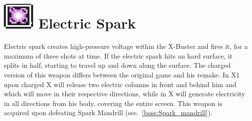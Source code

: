 \section{\includegraphics[scale=0.2]{figures/X1/weapons/E_Spark.jpg} Electric Spark}\label{Electric_spark}
Electric spark creates high-pressure voltage within the X-Buster and fires it, for a maximum of three shots at time. If the electric spark hits an hard surface, it splits in half, starting to travel up and down along the surface. The charged version of this weapon differs between the original game and his remake. In X1 upon charged X will release two electric columns in front and behind him and which will move in their respective directions, while in \mhx X will generate electricity in all directions from his body, covering the entire screen. This weapon is acquired upon defeating Spark Mandrill (sec.~\ref{boss:Spark_mandrill}).
